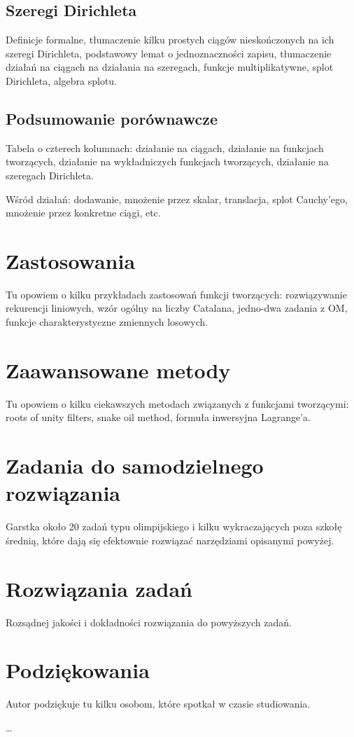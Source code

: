 \documentclass[shortabstract]{imthesis}
\begin{document}
\subsection{Szeregi Dirichleta}

Definicje formalne, tłumaczenie kilku prostych ciągów nieskończonych na ich szeregi Dirichleta, podstawowy lemat o jednoznaczności zapisu, tłumaczenie działań na ciągach na działania na szeregach, funkcje multiplikatywne, splot Dirichleta, algebra splotu.

\subsection{Podsumowanie porównawcze}

Tabela o czterech kolumnach: działanie na ciągach, działanie na funkcjach tworzących, działanie na wykładniczych funkcjach tworzących, działanie na szeregach Dirichleta.

Wśród działań: dodawanie, mnożenie przez skalar, translacja, splot Cauchy'ego, mnożenie przez konkretne ciągi, etc.

\section{Zastosowania}

Tu opowiem o kilku przykładach zastosowań funkcji tworzących: rozwiązywanie rekurencji liniowych, wzór ogólny na liczby Catalana, jedno-dwa zadania z OM, funkcje charakterystyczne zmiennych losowych.

\section{Zaawansowane metody}

Tu opowiem o kilku ciekawszych metodach związanych z funkcjami tworzącymi: roots of unity filters, snake oil method, formuła inwersyjna Lagrange'a.

\section{Zadania do samodzielnego rozwiązania}

Garstka około 20 zadań typu olimpijskiego i kilku wykraczających poza szkołę średnią, które dają się efektownie rozwiązać narzędziami opisanymi powyżej.

\section{Rozwiązania zadań}

Rozsądnej jakości i dokładności rozwiązania do powyższych zadań.

\section{Podziękowania}

	Autor podziękuje tu kilku osobom, które spotkał w czasie studiowania.

\ldots




\end{document}

